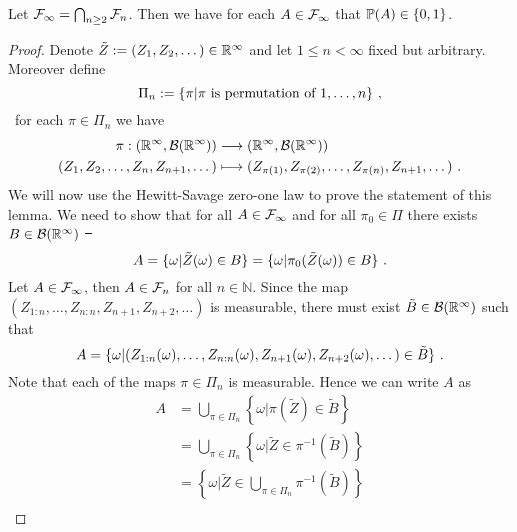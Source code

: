 \begin{lemma} \label{lem:hewitt_savage}
	Let $\F_\infty = \bigcap_{n\geq 2} \F_n$. Then we have for each $A\in \F_\infty$ that $\P(A)\in \{0,1\}$.
	\begin{proof}
		 Denote $\tilde{Z}:=(Z_1, Z_2,\dots)\in\R^\infty$ and let $1\leq n<\infty$ fixed but arbitrary. Moreover define 
		\begin{equation*}
			\Pi_n := \{\pi | \pi \textrm{ is permutation of } 1,\dots, n\} \mcomma
		\end{equation*}	
		\ie\ for each $\pi\in \Pi_n$ we have
		\begin{align*}
			\pi: (\R^\infty, \mathcal{B}(\R^\infty)) &\longrightarrow (\R^\infty, \mathcal{B}(\R^\infty))\\
			(Z_1, Z_2,\dots,Z_n, Z_{n+1}, \dots) &\longmapsto (Z_{\pi(1)}, Z_{\pi(2)},\dots,Z_{\pi(n)}, Z_{n+1}, \dots)\mdot
		\end{align*}
		We will now use the Hewitt-Savage zero-one law to prove the statement of this lemma. We need to show that for all $A\in\F_\infty$ and for all $\pi_0\in\Pi$ there exists $B\in\mathcal{B}(\R^\infty)$ \st\ 
		\begin{equation}
			A = \{\omega| \tilde{Z}(\omega) \in B\} = \{\omega| \pi_0(\tilde{Z}(\omega)) \in B\} \mdot
			\label{eq:hewitt_savage}
		\end{equation} 	
		Let $A\in\F_\infty$, then $A\in\F_n$ for all $n\in\mathbb{N}$. Since the map $(Z_{1:n}, \dots, Z_{n:n}, Z_{n+1}, Z_{n+2}, \dots)$ is measurable, there must exist $\tilde{B}\in\mathcal{B}(\R^\infty)$ such that
		\begin{equation*}
			A = \{\omega | (Z_{1:n}(\omega), \dots, Z_{n:n}(\omega), Z_{n+1}(\omega), Z_{n+2}(\omega), \dots) \in \tilde{B}\}\mdot 
			\label{eq:A_Z_inv}
		\end{equation*}
		Note that each of the maps $\pi\in\Pi_n$ is measurable. Hence we can write $A$ as
		\begin{align*}
			A &= \bigcup\limits_{\pi\in\Pi_n}\left \{\omega | \pi(\tilde{Z}) \in \tilde{B}\right\}\\
			&=  \bigcup\limits_{\pi\in\Pi_n} \left\{\omega | \tilde{Z} \in \pi^{-1}(\tilde{B})\right\}\\
			&=  \left\{\omega | \tilde{Z} \in \bigcup\limits_{\pi\in\Pi_n}\pi^{-1}(\tilde{B})\right\}\\

\end{align*}
\end{proof}
\end{lemma}

